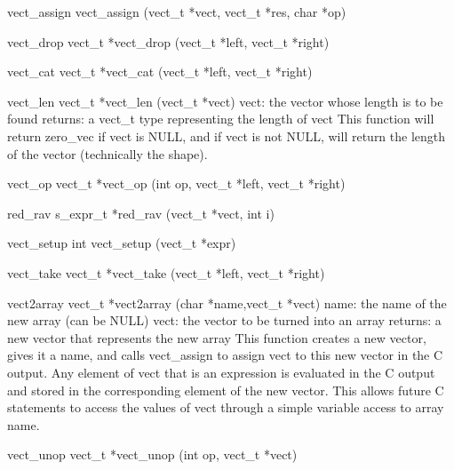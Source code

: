 vect_assign
  vect_assign (vect_t *vect, vect_t *res, char *op)

vect_drop
  vect_t *vect_drop (vect_t *left, vect_t *right)

vect_cat
  vect_t *vect_cat (vect_t *left, vect_t *right)

vect_len
  vect_t *vect_len (vect_t *vect)
    vect:  the vector whose length is to be found
    returns:  a vect_t type representing the length of vect
  This function will return zero_vec if vect is NULL, and if vect
  is not NULL, will return the length of the vector (technically
  the shape).

vect_op
  vect_t *vect_op (int op, vect_t *left, vect_t *right)

red_rav
  s_expr_t *red_rav (vect_t *vect, int i)

vect_setup
  int vect_setup (vect_t *expr)

vect_take
  vect_t *vect_take (vect_t *left, vect_t *right)
 
vect2array
  vect_t *vect2array (char *name,vect_t *vect)
    name:  the name of the new array (can be NULL)
    vect:  the vector to be turned into an array
    returns:  a new vector that represents the new array
  This function creates a new vector, gives it a name, and calls
  vect_assign to assign vect to this new vector in the C output.  
  Any element of vect that is an expression is evaluated in the C
  output and stored in the corresponding element of the new vector.
  This allows future C statements to access the values of vect 
  through a simple variable access to array name.

vect_unop
  vect_t *vect_unop (int op, vect_t *vect)

